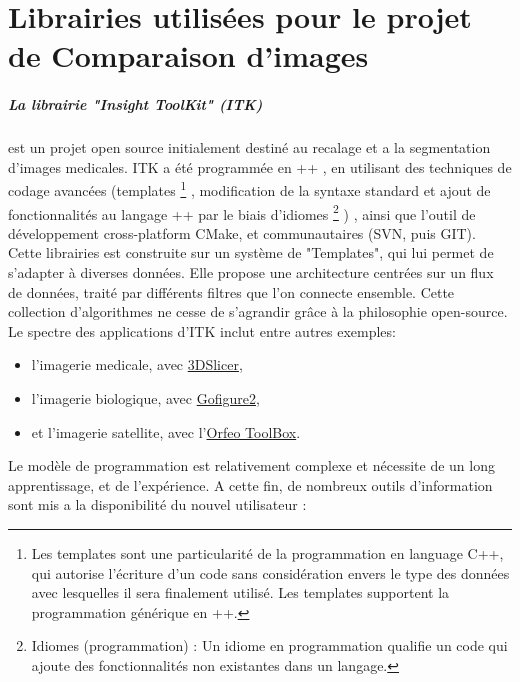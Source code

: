 


\chapter{Librairies utilisées pour le projet de Comparaison d'images}
\label{AnnexeDescriptionITKVTKQT}


\paragraph{La librairie "Insight ToolKit" (ITK)} est un projet open source initialement destiné au recalage et a la segmentation d'images medicales. ITK a été programmée en \C++ , en utilisant des techniques de codage avancées (templates
\footnote{Les templates sont une particularité de la programmation en language C++, qui autorise l'écriture d'un code sans considération envers le type des données avec lesquelles il sera finalement utilisé. Les templates supportent la programmation générique en {\C++}.}
, modification de la syntaxe standard et ajout de fonctionnalités au langage \C++ par le biais d'idiomes
\footnote{Idiomes (programmation) :  Un idiome en programmation qualifie un code qui ajoute des fonctionnalités non existantes dans un langage.}
) , ainsi que l'outil de développement cross-platform CMake, et communautaires (SVN, puis GIT). 
Cette librairies est construite sur un système de "Templates", qui lui permet de s'adapter à diverses données. Elle propose une architecture centrées sur un flux de données, traité par différents filtres que l'on connecte ensemble.
Cette collection d'algorithmes ne cesse de s'agrandir grâce à la philosophie open-source. Le spectre des applications d'ITK inclut entre autres exemples:  
\begin{itemize}
  \item l'imagerie medicale, avec \href{http://www.slicer.org/}{3DSlicer},
  \item l'imagerie biologique, avec \href{http://gofigure2.sourceforge.net/}{Gofigure2},
  \item et l'imagerie satellite, avec l'\href{http://www.orfeo-toolbox.org/otb/}{Orfeo ToolBox}.
\end{itemize}
Le modèle de programmation est relativement complexe et nécessite de un long apprentissage, et de l'expérience. A cette fin, de nombreux outils d'information sont mis a la disponibilité du nouvel utilisateur :
